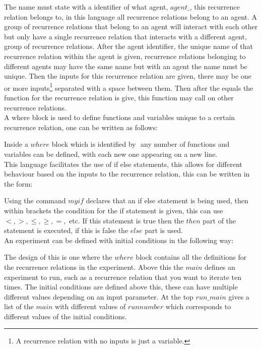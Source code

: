 \documentclass{article}
\begin{document}
The name must state with a identifier of what agent, $agent\_$, this recurrence relation belongs to, in this language all recurrence relations belong to an agent. A group of recurrence relations that belong to an agent will interact with each other but only have a single recurrence relation that interacts with a different agent, group of recurrence relations. After the agent identifier, the unique name of that recurrence relation within the agent is given, recurrence relations belonging to different agents may have the same name but with an agent the name must be unique. Then the inputs for this recurrence relation are given, there may be one or more inputs\footnote{A recurrence relation with no inputs is just a variable.} separated with a space between them. Then after the equals the function for the recurrence relation is give, this function may call on other recurrence relations.\\
A where block is used to define functions and variables unique to a certain recurrence relation, one can be written as follows:

Inside a $where$ block which is identified by ${}$ any number of functions and variables can be defined, with each new one appearing on a new line.\\
This language facilitates the use of if else statements, this allows for different behaviour based on the inputs to the recurrence relation, this can be written in the form:

Using the command $myif$ declares that an if else statement is being used, then within brackets the condition for the if statement is given, this can use $<, >, \leq, \geq, =,$ etc. If this statement is true then the $then$ part of the statement is executed, if this is false the $else$ part is used.\\
 An experiment can be defined with initial conditions in the following way:

The design of this is one where the $where$ block contains all the definitions for the recurrence relations in the experiment. Above this the $main$ defines an experiment to run, such as a recurrence relation that you want to iterate ten times. The initial conditions are defined above this, these can have multiple different values depending on an input parameter. At the top $run\_main$ gives a list of the $main$ with different values of $runnumber$ which corresponds to different values of the initial conditions.\\
 
\end{document}
